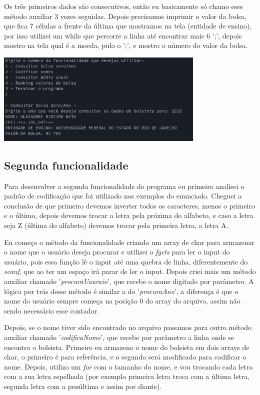 \documentclass[11pt]{article}
\begin{document}
Os três primeiros dados são consecutivos, então eu basicamente só chamo esse método auxiliar 3 vezes seguidas. Depois precisamos imprimir o valor da bolsa, que fica 7 células a frente da última que mostramos na tela (entidade de ensino), por isso utilizei um while que percorre a linha até encontrar mais 6 ';', depois mostro na tela qual é a moeda, pulo o ';', e mostro o número do valor da bolsa.

\includegraphics[width=10cm]{func1.png}

\subsection{Segunda funcionalidade}
\label{sec:org5958951}
Para desenvolver a segunda funcionalidade do programa eu primeiro analisei o padrão de codificação que foi utilizado nos exemplos do enunciado. Cheguei a conclusão de que primeiro devemos inverter todos os caracteres, menos o primeiro e o último, depois devemos trocar a letra pela próxima do alfabeto, e caso a letra seja Z (última do alfabeto) devemos trocar pela primeira letra, a letra A.

Eu começo o método da funcionalidade criando um array de char para armazenar o nome que o usuário deseja procurar e utilizei o \emph{fgets} para ler o input do usuário, pois essa função lê o input até uma quebra de linha, diferentemente do \emph{scanf}, que ao ter um espaço irá parar de ler o input. Depois criei mais um método auxiliar chamado '\emph{procuraUauraio}', que recebe o nome digitado por parâmetro. A lógica por trás desse método é similar a do '\emph{procuraAno}', a diferença é que o nome do usuário sempre começa na posição 0 do array do arquivo, assim não sendo necessário esse contador.

Depois, se o nome tiver sido encontrado no arquivo passamos para outro método auxiliar chamado '\emph{codificaNome}', que recebe por parâmetro a linha onde se encontra o bolsista. Primeiro eu armazeno o nome do bolsista em dois arrays de char, o primeiro é para referência, e o segundo será modificado para codificar o nome. Depois, utilizo um \emph{for} com o tamanho do nome, e vou trocando cada letra com a sua letra espelhada (por exemplo primeira letra troca com a última letra, segunda letra com a penúltima e assim por diante).
\end{document}
